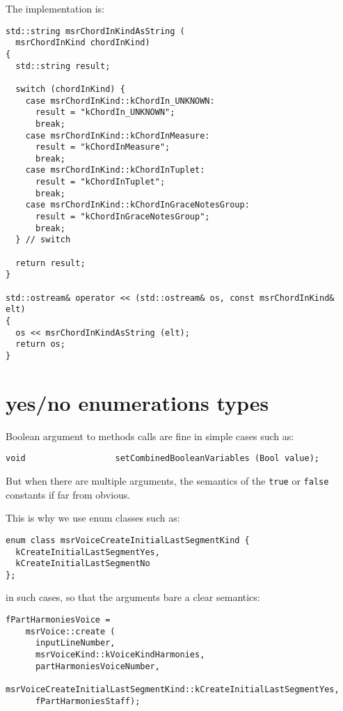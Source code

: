 The implementation is:
\begin{lstlisting}[language=CPlusPlus]
std::string msrChordInKindAsString (
  msrChordInKind chordInKind)
{
  std::string result;

  switch (chordInKind) {
    case msrChordInKind::kChordIn_UNKNOWN:
      result = "kChordIn_UNKNOWN";
      break;
    case msrChordInKind::kChordInMeasure:
      result = "kChordInMeasure";
      break;
    case msrChordInKind::kChordInTuplet:
      result = "kChordInTuplet";
      break;
    case msrChordInKind::kChordInGraceNotesGroup:
      result = "kChordInGraceNotesGroup";
      break;
  } // switch

  return result;
}

std::ostream& operator << (std::ostream& os, const msrChordInKind& elt)
{
  os << msrChordInKindAsString (elt);
  return os;
}
\end{lstlisting}


\section{yes/no enumerations types}

Boolean argument to methods calls are fine in simple cases such as:
\begin{lstlisting}[language=CPlusPlus]
    void                  setCombinedBooleanVariables (Bool value);
\end{lstlisting}

But when there are multiple arguments, the semantics of the {\tt true} or {\tt false} constants if far from obvious.

This is why we use enum classes such as:
\begin{lstlisting}[language=CPlusPlus]
enum class msrVoiceCreateInitialLastSegmentKind {
  kCreateInitialLastSegmentYes,
  kCreateInitialLastSegmentNo
};
\end{lstlisting}

in such cases, so that the arguments bare a clear semantics:
\begin{lstlisting}[language=CPlusPlus]
  fPartHarmoniesVoice =
    msrVoice::create (
      inputLineNumber,
      msrVoiceKind::kVoiceKindHarmonies,
      partHarmoniesVoiceNumber,
      msrVoiceCreateInitialLastSegmentKind::kCreateInitialLastSegmentYes,
      fPartHarmoniesStaff);
\end{lstlisting}



